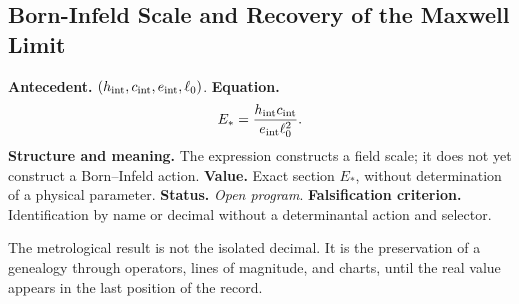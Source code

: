 \subsection*{Born-Infeld Scale and Recovery of the Maxwell Limit}
\textbf{Antecedent.} \((h_{\rm int},c_{\rm int},e_{\rm int},\ell_0)\).
\textbf{Equation.}
\begin{equation}
E_*=\frac{h_{\rm int}c_{\rm int}}{e_{\rm int}\ell_0^2}.
\label{eq:atlas-born}
\end{equation}
\textbf{Structure and meaning.} The expression constructs a field
scale; it does not yet construct a Born--Infeld action.
\textbf{Value.} Exact section \(E_*\), without determination of a
physical parameter.
\textbf{Status.} \emph{Open program}. \textbf{Falsification criterion.} Identification
by name or decimal without a determinantal action and selector.

\begin{proposition}
The metrological result is not the isolated decimal. It is the preservation of
a genealogy through operators, lines of magnitude, and charts, until
the real value appears in the last position of the record.
\end{proposition}
